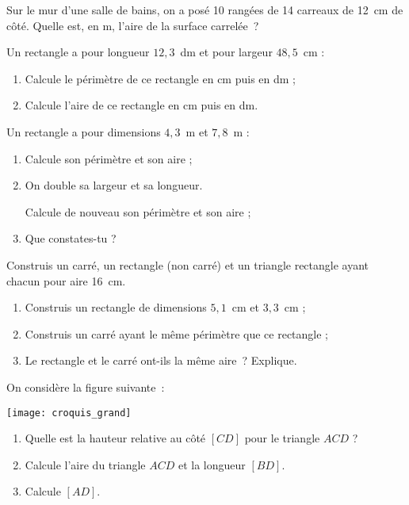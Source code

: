 \begin{exercice}
Sur le mur d’une salle de bains, on a posé 10 rangées de 14 carreaux de 12 cm de côté. Quelle est, en m, l’aire de la surface carrelée ?
\end{exercice}


\begin{exercice}
Un rectangle a pour longueur $12,3$ dm et pour largeur $48,5$ cm :
\begin{enumerate}
 \item Calcule le périmètre de ce rectangle en cm puis en dm ;
 \item Calcule l'aire de ce rectangle en cm puis en dm.
 \end{enumerate}
\end{exercice}


\begin{exercice}[Agrandissement]
Un rectangle a pour dimensions $4,3$ m et $7,8$ m :
\begin{enumerate}
 \item Calcule son périmètre et son aire ;
 \item On double sa largeur et sa longueur.
 
Calcule de nouveau son périmètre et son aire ;
 \item Que constates-tu ?
 \end{enumerate}
\end{exercice}


\begin{exercice}
Construis un carré, un rectangle (non carré) et un triangle rectangle ayant chacun pour aire 16 cm.
\end{exercice}


\begin{exercice}
\begin{enumerate}
 \item Construis un rectangle de dimensions $5,1$ cm et $3,3$ cm ;
 \item Construis un carré ayant le même périmètre que ce rectangle ;
 \item Le rectangle et le carré ont-ils la même aire ? Explique.
 \end{enumerate}
\end{exercice}


\begin{exercice}
On considère la figure suivante :
\begin{center} \texttt{[image: croquis\_grand]} \end{center}
\begin{enumerate}
 \item Quelle est la hauteur relative au côté $[CD]$ pour le triangle $ACD$ ?
 \item Calcule l'aire du triangle $ACD$ et la longueur $[BD]$.
 \item Calcule $[AD]$.
 \end{enumerate}
\end{exercice}



